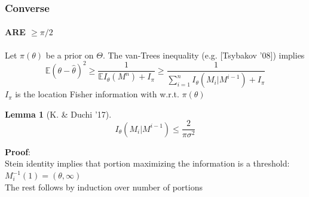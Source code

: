 \documentclass[mathserif]{beamer}
\newcommand{\sgn}{\mathsf{sign}}
\newtheorem{lem}{Lemma}
\begin{document}
%
%
%

\begin{frame}
\frametitle{Converse}
\framesubtitle{ARE $\geq \pi/2$}
Let $\pi(\theta)$ be a prior on $\Theta$. The van-Trees inequality (e.g. [Tsybakov '08]) implies
\[
\mathbb E \left(\theta - \widehat{\theta} \right)^2 \geq \frac{1}{\mathbb E I_\theta(M^n) + I_\pi} \geq \frac{1}{\sum_{i=1}^n I_\theta(M_i|M^{i-1}) + I_\pi} 
\]
$I_\pi$ is the location Fisher information with w.r.t. $\pi(\theta)$ \\

\begin{lem}[K. \& Duchi '17]
\[
I_\theta(M_i|M^{i-1}) \leq \frac{2}{\pi\sigma^2}
\]
\end{lem}
\textbf{Proof}: \\
Stein identity implies that portion maximizing the information is a threshold: $M_i^{-1}(1) = (\theta,\infty)$  \\
The rest follows by induction over number of portions
\end{frame}
\end{document}
